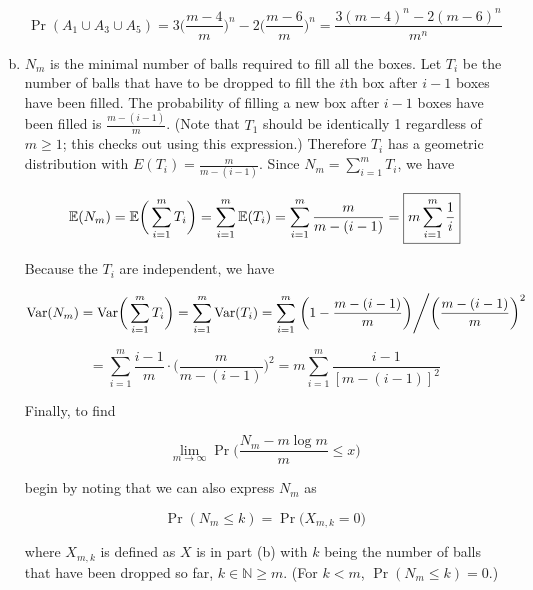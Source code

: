 \begin{enumerate}[(a)]
\[
\Pr(A_1 \cup A_3 \cup A_5) = 3\bigg(  \frac{m-4}{m} \bigg)^n -  2 \bigg(  \frac{m-6}{m} \bigg)^n  = \boxed{ \frac{3(m-4)^n - 2(m-6)^n}{m^n}}
\]

\item



\(N_m\) is the minimal number of balls required to fill all the boxes. Let \(T_i\) be the number of balls that have to be dropped to fill the \(i\)th box after \(i - 1\) boxes have been filled. The probability of filling a new box after \(i -1\) boxes have been filled is \( \frac{m - (i - 1)}{m}\). (Note that \(T_1\) should be identically 1 regardless of \(m \geq 1\); this checks out using this expression.) Therefore \(T_i\) has a geometric distribution with \(E(T_i) = \frac{m}{m - (i - 1)}\). Since \(N_m = \sum_{i=1}^m T_i\), we have


\[
\mathbb{E}(N_m) = \mathbb{E} \bigg(  \sum_{i=1}^m T_i   \bigg) =  \sum_{i=1}^m \mathbb{E}( T_i )  =  \sum_{i=1}^m \frac{m}{m - (i - 1)} = \boxed{m  \sum_{i=1}^m \frac{1}{i }}
\]

Because the \(T_i\) are independent, we have

\[
\mathrm{Var}(N_m) = \mathrm{Var} \bigg(  \sum_{i=1}^m T_i   \bigg) =  \sum_{i=1}^m \mathrm{Var}( T_i )  =  \sum_{i=1}^m \left. \bigg( 1 -  \frac{m - (i - 1)}{m} \bigg) \middle/ \bigg( \frac{m - (i - 1)}{m} \bigg)^2 \right.
\]

\[
=  \sum_{i=1}^m  \frac{  i - 1}{m} \cdot \bigg( \frac{m}{m - (i - 1)} \bigg)^2 = \boxed{  m\sum_{i=1}^m  \frac{ i - 1}{[m - (i - 1)]^2} }
\]


Finally, to find

\[
\lim_{m \to \infty} \Pr \bigg( \frac{N_m - m \log m}{m} \leq x \bigg) 
\]

begin by noting that we can also express \(N_m\) as 

\[
\Pr(N_m \leq k) = \Pr \big( X_{m, k} = 0 \big)
\]

where \(X_{m, k}\) is defined as \(X\) is in part (b) with \(k\) being the number of balls that have been dropped so far, \(k \in \mathbb{N} \geq m\). (For \(k < m\), \(\Pr(N_m \leq k) = 0\).)

\


\end{enumerate}
